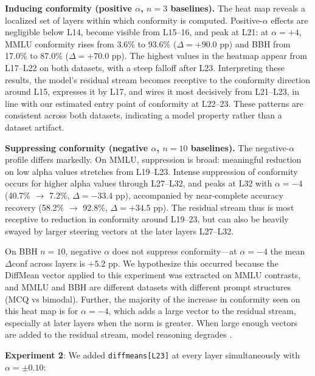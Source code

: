 \textbf{Inducing conformity (positive $\alpha$, $n=3$ baselines).} The heat map reveals a localized set of layers within which conformity is computed. Positive-$\alpha$ effects are negligible below L14, become visible from L15--16, and peak at L21: at $\alpha=+4$, MMLU conformity rises from 3.6\% to 93.6\% ($\Delta = +90.0$ pp) and BBH from 17.0\% to 87.0\% ($\Delta = +70.0$ pp). The highest values in the heatmap appear from L17--L22 on both datasets, with a steep falloff after L23. Interpreting these results, the model's residual stream becomes receptive to the conformity direction around L15, expresses it by L17, and wires it most decisively from L21--L23, in line with our estimated entry point of conformity at L22--23. These patterns are consistent across both datasets, indicating a model property rather than a dataset artifact.

\textbf{Suppressing conformity (negative $\alpha$, $n=10$ baselines).} The negative-$\alpha$ profile differs markedly. On MMLU, suppression is broad: meaningful reduction on low alpha values stretches from L19--L23. Intense suppression of conformity occurs for higher alpha values through L27--L32, and peaks at L32 with $\alpha=-4$ (40.7\% $\rightarrow$ 7.2\%, $\Delta = -33.4$ pp), accompanied by near-complete accuracy recovery (58.2\% $\rightarrow$ 92.8\%, $\Delta = +34.5$ pp). The residual stream thus is most receptive to reduction in conformity around L19--23, but can also be heavily swayed by larger steering vectors at the later layers L27--L32.

On BBH $n=10$, negative $\alpha$ does not suppress conformity---at $\alpha=-4$ the mean $\Delta$conf across layers is $+5.2$ pp. We hypothesize this occurred because the DiffMean vector applied to this experiment was extracted on MMLU contrasts, and MMLU and BBH are different datasets with different prompt structures (MCQ vs bimodal). Further, the majority of the increase in conformity seen on this heat map is for $\alpha=-4$, which adds a large vector to the residual stream, especially at later layers when the norm is greater. When large enough vectors are added to the residual stream, model reasoning degrades \citep{stickland2024steering}.

\textbf{Experiment 2}: We added \texttt{diffmeans[L23]} at every layer simultaneously with $\alpha = \pm 0.10$:

